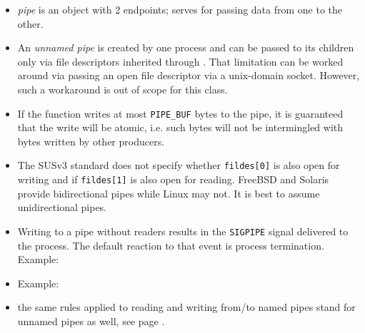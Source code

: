 \begin{itemize}
\item \emph{pipe} is an object with 2 endpoints; serves for passing data from
one to the other.
\item An \emph{unnamed pipe} is created by one process and can be passed to its
children only via file descriptors inherited through .  That
limitation can be worked around via passing an open file descriptor via a
u{}nix-domain socket.  However, such a workaround is out of scope for this
class.
\item If the function  writes at most \texttt{PIPE\_BUF} bytes to
the pipe, it is guaranteed that the write will be atomic, i.e. such bytes will
not be intermingled with bytes written by other producers.
\item {} The SUSv3 standard does not specify whether
\texttt{fildes[0]} is also open for writing and if \texttt{fildes[1]} is also
open for reading.  FreeBSD and Solaris provide bidirectional pipes while Linux
may not.  It is best to assume unidirectional pipes.
\item Writing to a pipe without readers results in the \texttt{SIGPIPE} signal
delivered to the process. The default reaction to that event is process
termination. Example: 
\item Example: 
\item {} the same rules applied to reading and writing from/to
named pipes stand for unnamed pipes as well, see page \pageref{NAMEDPIPE}.
\end{itemize}


\begin{slide}
\begin{center}

\end{center}
\end{slide}


